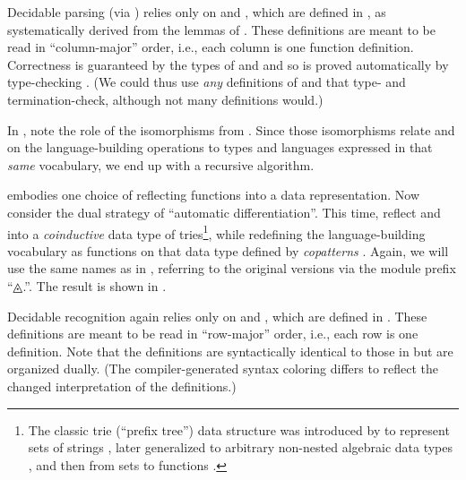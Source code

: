 \documentclass[acmsmall,screen,anonymous,timestamp]{acmart}
\begin{document}
Decidable parsing (via {}) relies only on  and , which are defined in , as systematically derived from the lemmas of .
These definitions are meant to be read in ``column-major'' order, i.e., each column is one function definition.
Correctness is guaranteed by the types of  and  and so is proved automatically by type-checking .
(We could thus use \emph{any} definitions of  and  that type- and termination-check, although not many definitions would.)

In , note the role of the isomorphisms from .
Since those isomorphisms relate  and  on the language-building operations to types and languages expressed in that \emph{same} vocabulary, we end up with a recursive algorithm.

\rnc{}

\rnc{}

 embodies one choice of reflecting functions into a data representation.
Now consider the dual strategy of ``automatic differentiation''.
This time, reflect  and  into a \emph{coinductive} data type of tries\footnote{The classic trie (``prefix tree'') data structure was introduced by \citet{Thue1912Gegenseitige} to represent sets of strings \citep[Section 6.3]{Knuth1998ACP3}, later generalized to arbitrary non-nested algebraic data types \citep{Connelly1995GenTrie}, and then from sets to functions \citep{Hinze2000GGT}.}, while redefining the language-building vocabulary as functions on that data type defined by \emph{copatterns} \citep{AbelPientka2016}.
Again, we will use the same names as in , referring to the original versions via the module prefix ``{◬.}\hspace{0.05em}''.
The result is shown in .

Decidable recognition again relies only on  and , which are defined in .
These definitions are meant to be read in ``row-major'' order, i.e., each row is one definition.
Note that the definitions are syntactically identical to those in  but are organized dually.
(The compiler-generated syntax coloring differs to reflect the changed interpretation of the definitions.)
\end{document}
